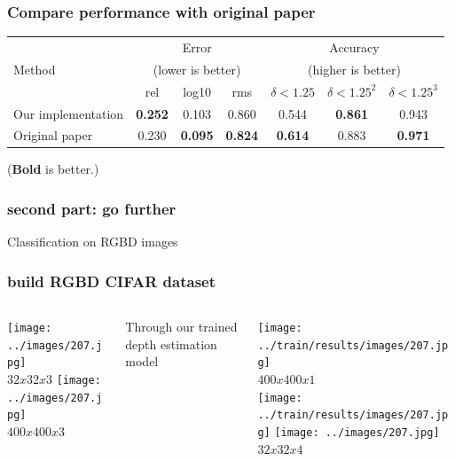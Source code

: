 \documentclass{beamer}
\begin{document}
\begin{frame}
\frametitle{Compare performance with original paper}
\begin{table} [t] \center
\resizebox{\linewidth}{!} {
\begin{tabular}{ | l |  c  c  c | c  c  c |}
\hline 
\multirow{3}{*}{{{Method}}} &\multicolumn{3}{c|}{Error} &\multicolumn{3}{c|}{Accuracy} \\
&\multicolumn{3}{c|}{(lower is better)} &\multicolumn{3}{c|}{(higher is better)} \\
\cline{2-7}
&rel &log10 &rms &$\delta < 1.25$ &$\delta < 1.25^2$ &$\delta < 1.25^3$  \\
\hline
%
%
Our implementation &\textbf{0.252}	 &0.103	  &0.860  	&0.544   	&\textbf{0.861}	&0.943  \\
Original paper    &0.230	 &\textbf{0.095} 	 &\textbf{0.824}  &\textbf{0.614} 	 &0.883	 &\textbf{0.971} \\
\hline
\end{tabular}
}
\end{table}
(\textbf{Bold} is better.)
\end{frame}


\begin{frame}
\frametitle{second part: go further}
\Huge{\centerline{Classification on RGBD images}}
\end{frame}


\begin{frame}
\frametitle{build RGBD CIFAR dataset}
\begin{columns}
\begin{column}{.3\textwidth}
\texttt{[image: ../images/207.jpg]}\\
$32x32x3$
\texttt{[image: ../images/207.jpg]}\\
$400x400x3$
\end{column}

\begin{column}{.2\textwidth}
Through our trained depth estimation model
\end{column}
\begin{column}{.4\textwidth}
\texttt{[image: ../train/results/images/207.jpg]}\\
$400x400x1$\\
\texttt{[image: ../train/results/images/207.jpg]}
\texttt{[image: ../images/207.jpg]}\\
$32x32x4$
\end{column}
\end{columns}
\end{frame}
\end{document}
